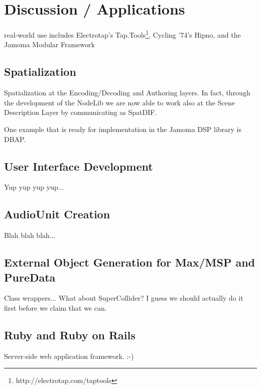 \documentclass[twoside,10pt]{article}
\begin{document}



\section{Discussion / Applications} %

real-world use includes Electrotap's Tap.Tools\footnote{http://electrotap.com/taptools}, Cycling '74's Hipno\cite{Place:2005}, and the Jamoma Modular Framework\cite{Place:2006}


\subsection{Spatialization}

Spatialization at the Encoding/Decoding and Authoring layers\cite{Peters:2009}.  In fact, through the development of the NodeLib we are now able to work also at the Scene Description Layer by communicating as SpatDIF\cite{Peters:2008spatdif}.

One example that is ready for implementation in the Jamoma DSP library is DBAP\cite{Lossius:2009}.


\subsection{User Interface Development}

Yup yup yup yup...

\subsection{AudioUnit Creation}

Blah blah blah...

\subsection{External Object Generation for Max/MSP and PureData}

Class wrappers...  What about SuperCollider?  I guess we should actually do it first before we claim that we can.

\subsection{Ruby and Ruby on Rails}

Server-side web application framework.  :-)
\end{document}
